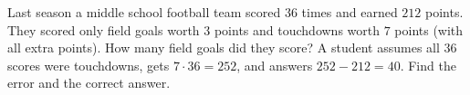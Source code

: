 Last season a middle school football team scored $36$ times and earned $212$ points. They scored only field goals worth $3$ points and touchdowns worth $7$ points (with all extra points). How many field goals did they score? A student assumes all $36$ scores were touchdowns, gets $7\cdot36=252$, and answers $252-212=40$. Find the error and the correct answer.

